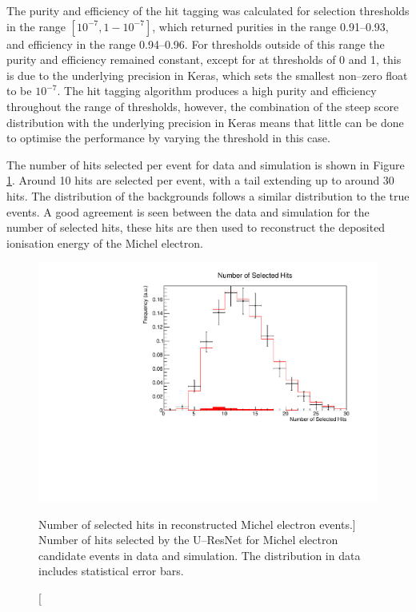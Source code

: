 The purity and efficiency of the hit tagging was calculated for selection 
thresholds in the range $[10^{-7}, 1 - 10^{-7}]$, which returned purities in 
the range 0.91--0.93, and efficiency in the range 0.94--0.96. For thresholds 
outside of this range the purity and efficiency remained constant, except 
for at thresholds of 0 and 1, this is due to the underlying precision in 
Keras, which sets the smallest non--zero float to be $10^{-7}$. The hit tagging 
algorithm produces a high purity and efficiency throughout the range of 
thresholds, however, the combination of the steep score distribution with the 
underlying precision in Keras means that little can be done to optimise the 
performance by varying the threshold in this case.

The number of hits selected per event for data and simulation is shown in
Figure \ref{fig:mich_n_hits}. Around 10 hits are selected per event, with a
tail extending up to around 30 hits. The distribution of the backgrounds
follows a similar distribution to the true events. A good agreement is seen
between the data and simulation for the number of selected hits, these hits
are then used to reconstruct the deposited ionisation energy of the Michel
electron.
\begin{figure}
	\centering
	\includegraphics[width=\textwidth]{figures/mich_n_hits.pdf}
	\caption
	[Number of selected hits in reconstructed Michel electron events.]
	{Number of hits selected by the U--ResNet for Michel electron candidate
	events in data and simulation. The distribution in data includes statistical
	error bars.}
	\label{fig:mich_n_hits}
\end{figure}

